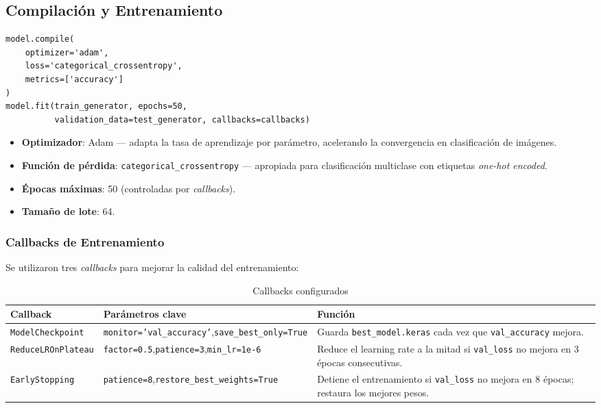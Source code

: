 \documentclass[12pt, a4paper]{article}
\begin{document}
\subsection{Compilación y Entrenamiento}

\begin{lstlisting}[style=python]
model.compile(
    optimizer='adam',
    loss='categorical_crossentropy',
    metrics=['accuracy']
)
model.fit(train_generator, epochs=50,
          validation_data=test_generator, callbacks=callbacks)
\end{lstlisting}

\begin{itemize}
  \item \textbf{Optimizador}: Adam — adapta la tasa de aprendizaje por parámetro, acelerando
        la convergencia en clasificación de imágenes.
  \item \textbf{Función de pérdida}: \texttt{categorical\_crossentropy} — apropiada para
        clasificación multiclase con etiquetas \textit{one-hot encoded}.
  \item \textbf{Épocas máximas}: 50 (controladas por \textit{callbacks}).
  \item \textbf{Tamaño de lote}: 64.
\end{itemize}

\subsubsection{Callbacks de Entrenamiento}

Se utilizaron tres \textit{callbacks} para mejorar la calidad del entrenamiento:

\begin{table}[H]
  \centering
  \caption{Callbacks configurados}
  \begin{tabular}{p{3.5cm}p{4.5cm}p{5.5cm}}
    \toprule
    \textbf{Callback} & \textbf{Parámetros clave} & \textbf{Función} \\
    \midrule
    \texttt{ModelCheckpoint} &
      \texttt{monitor='val\_accuracy'},\newline\texttt{save\_best\_only=True} &
      Guarda \texttt{best\_model.keras} cada vez que \texttt{val\_accuracy} mejora. \\
    \addlinespace
    \texttt{ReduceLROnPlateau} &
      \texttt{factor=0.5},\newline\texttt{patience=3},\newline\texttt{min\_lr=1e-6} &
      Reduce el learning rate a la mitad si \texttt{val\_loss} no mejora en 3 épocas consecutivas. \\
    \addlinespace
    \texttt{EarlyStopping} &
      \texttt{patience=8},\newline\texttt{restore\_best\_weights=True} &
      Detiene el entrenamiento si \texttt{val\_loss} no mejora en 8 épocas; restaura los mejores pesos. \\
    \bottomrule
  \end{tabular}
\end{table}
\end{document}
